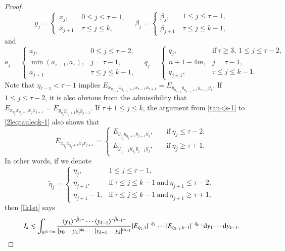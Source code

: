\documentclass[11pt,reqno]{amsart}
\def\d{{\rm d}}
\numberwithin{equation}{section}
\theoremstyle{definition}
\begin{document}
\begin{proof}
\begin{equation*}
		y_j=\begin{cases}
			x_j,\quad&0\leq j\leq\tau-1,\\
			x_{j+1}&\tau\leq j\leq k,
		\end{cases}
		\quad\tilde{\beta}_j=\begin{cases}
			\beta_j,\quad&1\leq j\leq\tau-1,\\
			\beta_{j+1}&\tau\leq j\leq k-1,
		\end{cases}
	\end{equation*}
	and
	\begin{equation*}\label{relabel2}
		\tilde{a}_j=\begin{cases}
			a_j,\quad&0\leq j\leq\tau-2,\\
			\min(a_{\tau-1},a_\tau),&j=\tau-1,\\
			a_{j+1}&\tau\leq j\leq k-1,
		\end{cases}
		\quad\tilde{q}_j=\begin{cases}
			q_j,\quad&\text{if}~\tau\geq3,~1\leq j\leq\tau-2,\\
			n+1-4m,&j=\tau-1,\\
			q_{j+1},&\tau\leq j\leq k-1.
		\end{cases}
	\end{equation*}
	Note that $\eta_{\tau-1}<\tau-1$ implies $E_{x_{\eta_{\tau-1}}x_{\eta_{\tau-1}+1}x_{\tau-1}x_{\tau+1}}=E_{y_{\eta_{\tau-1}}y_{\eta_{\tau-1}+1}y_{\tau-1}y_\tau}$. If $1\leq j\leq\tau-2$, it is also obvious from the admissibility that $E_{x_{\eta_j}x_{\eta_j+1}x_jx_{j+1}}=E_{y_{\eta_j}y_{\eta_j+1}y_jy_{j+1}}$. If $\tau+1\leq j\leq k$, the argument from \eqref{tau<s-1} to \eqref{2leqtauleqk-1} also shows that
	\begin{equation*}
		E_{x_{\eta_j}x_{\eta_j+1}x_jx_{j+1}}=\begin{cases}E_{y_{\eta_j}y_{\eta_j+1}y_{j-1}y_j},\quad&\text{if}~\eta_j\leq\tau-2,\\
			E_{y_{\eta_j-1}y_{\eta_j}y_{j-1}y_j},&\text{if}~\eta_j\geq\tau+1.
		\end{cases}
	\end{equation*}
	In other words, if we denote
	\begin{equation*}\label{deftildeeta}
		\tilde{\eta}_j=\begin{cases}
			\eta_j,\quad&1\leq j\leq\tau-1,\\
			\eta_{j+1},&\text{if}~\tau\leq j\leq k-1~\text{and}~\eta_{j+1}\leq\tau-2,\\
			\eta_{j+1}-1,&\text{if}~\tau\leq j\leq k-1~\text{and}~\eta_{j+1}\geq\tau+1,
		\end{cases}
	\end{equation*}
	then \eqref{Ik1st} says
	\begin{equation}\label{I_ktoI_k-1}
		I_k\lesssim\int_{\mathbb{R}^{(k-1)n}}\frac{\langle y_1\rangle^{-\tilde{\beta}_1-}\cdots\langle y_{k-1}\rangle^{-\tilde{\beta}_{k-1}-}}{|y_0-y_1|^{\tilde{a}_0}\cdots|y_{k-1}-y_k|^{\tilde{a}_{k-1}}}|E_{\tilde{\eta}_1,1}|^{-\tilde{q}_1}\cdots|E_{\tilde{\eta}_{k-1},k-1}|^{-\tilde{q}_{k-1}}\d y_1\cdots \d y_{k-1}.
	\end{equation}
	

\end{proof}
\end{document}

